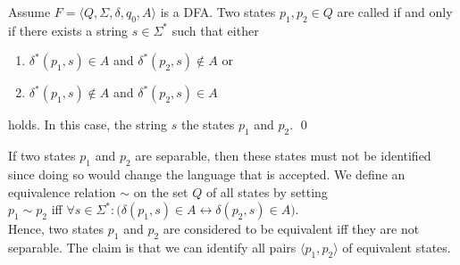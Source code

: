 \begin{Definition}
Assume $F = \langle Q, \Sigma, \delta, q_0, A \rangle$ is a \textsc{DFA}.
Two states $p_1,p_2 \in Q$ are called   if and only if there exists a string 
$s \in \Sigma^*$ such that either
\begin{enumerate}
\item $\delta^*(p_1,s) \in    A$ and $\delta^*(p_2,s) \notin A$ or
\item $\delta^*(p_1,s) \notin A$ and $\delta^*(p_2,s) \in    A$
\end{enumerate}
holds.  In this case, the string $s$   the states $p_1$ and $p_2$. \qed
\end{Definition}
If two states $p_1$ and $p_2$ are separable, then these states must not be identified since doing
so would change the language that is accepted.  We define an equivalence relation $\sim$ on the set $Q$ of all
states by setting 
\\[0.2cm]
\hspace*{1.3cm}
$p_1 \sim p_2$ \quad iff \quad 
$\forall s \in \Sigma^*:\bigl(\delta(p_1,s) \in A \leftrightarrow \delta(p_2,s) \in A\bigr)$.
\\[0.2cm]
Hence, two states $p_1$ and $p_2$ are considered to be equivalent iff they are not separable.   
The claim is that we can identify all pairs $\langle p_1, p_2\rangle$ of equivalent states.  

